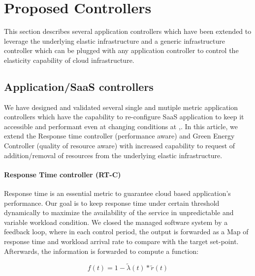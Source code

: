 \section{Proposed Controllers}

This section describes several application controllers which have been extended to leverage the underlying elastic infrastructure and a generic infrastructure controller which can be plugged with any application controller to control the elasticity capability of cloud infrastructure. 

\subsection{Application/SaaS controllers} \label{saas-controller}


We have designed and validated several single and mutiple metric application controllers which have the capability to re-configure SaaS application to keep it accessible and performant even at changing conditions at \cite{sabbir},\cite{tsc}. In this article, we extend the Response time controller (performance aware) and Green Energy Controller (quality of resource aware) with increased capability to request of addition/removal of resources from the underlying elastic infrastructure.


\paragraph*{\textbf{Response Time controller (RT-C)}}
Response time is an essential metric to guarantee cloud
based application's performance. Our goal is to keep response
time under certain threshold dynamically to maximize the
availability of the service in unpredictable and variable
workload condition. We closed the managed software
system by a feedback loop, where in each control period, the
output is forwarded as a Map of response time and workload
arrival rate to compare with the target set-point. Afterwards, the information is forwarded to compute a function:

\begin{equation}
f(t)=1-\tilde{\lambda}(t)*\tilde{r}(t)
\end{equation} 


